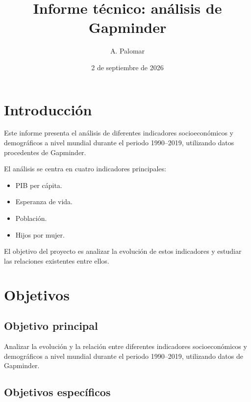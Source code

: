 \documentclass{article}
\begin{document}


\title{Informe técnico: análisis de Gapminder}
\author{A. Palomar}
\date{2 de septiembre de 2026}

\maketitle


\section{Introducción}

Este informe presenta el análisis de diferentes indicadores socioeconómicos
y demográficos a nivel mundial durante el periodo 1990--2019, utilizando
datos procedentes de Gapminder.

El análisis se centra en cuatro indicadores principales:

\begin{itemize}
    \item PIB per cápita.
    \item Esperanza de vida.
    \item Población.
    \item Hijos por mujer.
\end{itemize}

El objetivo del proyecto es analizar la evolución de estos indicadores
y estudiar las relaciones existentes entre ellos.

\section{Objetivos}

\subsection{Objetivo principal}

Analizar la evolución y la relación entre diferentes indicadores
socioeconómicos y demográficos a nivel mundial durante el periodo
1990--2019, utilizando datos de Gapminder.

\subsection{Objetivos específicos}
\end{document}
